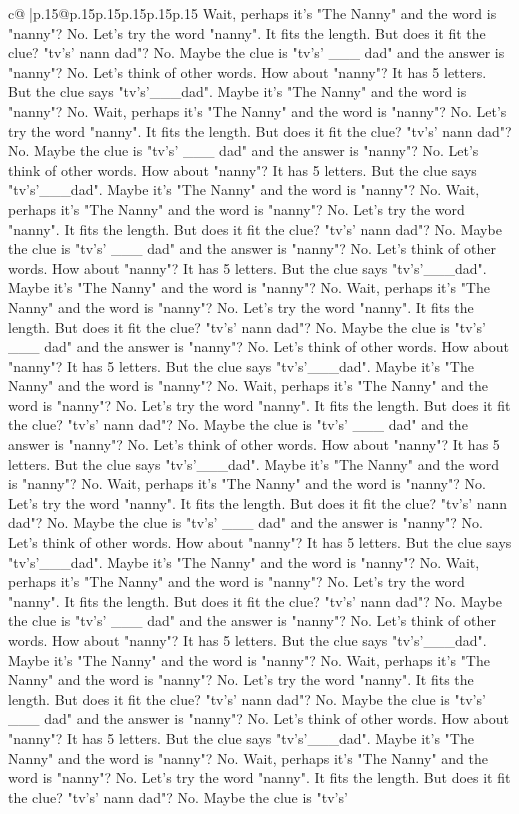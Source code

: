 \documentclass{article}
\begin{document}
{\begin{supertabular}{c@{$\;$}|p{.15\linewidth}@{}p{.15\linewidth}p{.15\linewidth}p{.15\linewidth}p{.15\linewidth}p{.15\linewidth}}
{{{Wait, perhaps it's "The Nanny" and the word is "nanny"? No. Let's try the word "nanny". It fits the length. But does it fit the clue? "tv's' nann dad"? No. Maybe the clue is "tv's' \_\_\_ dad" and the answer is "nanny"? No. Let's think of other words. How about "nanny"? It has 5 letters. But the clue says "tv's'\_\_\_dad". Maybe it's "The Nanny" and the word is "nanny"? No. Wait, perhaps it's "The Nanny" and the word is "nanny"? No. Let's try the word "nanny". It fits the length. But does it fit the clue? "tv's' nann dad"? No. Maybe the clue is "tv's' \_\_\_ dad" and the answer is "nanny"? No. Let's think of other words. How about "nanny"? It has 5 letters. But the clue says "tv's'\_\_\_dad". Maybe it's "The Nanny" and the word is "nanny"? No. Wait, perhaps it's "The Nanny" and the word is "nanny"? No. Let's try the word "nanny". It fits the length. But does it fit the clue? "tv's' nann dad"? No. Maybe the clue is "tv's' \_\_\_ dad" and the answer is "nanny"? No. Let's think of other words. How about "nanny"? It has 5 letters. But the clue says "tv's'\_\_\_dad". Maybe it's "The Nanny" and the word is "nanny"? No. Wait, perhaps it's "The Nanny" and the word is "nanny"? No. Let's try the word "nanny". It fits the length. But does it fit the clue? "tv's' nann dad"? No. Maybe the clue is "tv's' \_\_\_ dad" and the answer is "nanny"? No. Let's think of other words. How about "nanny"? It has 5 letters. But the clue says "tv's'\_\_\_dad". Maybe it's "The Nanny" and the word is "nanny"? No. Wait, perhaps it's "The Nanny" and the word is "nanny"? No. Let's try the word "nanny". It fits the length. But does it fit the clue? "tv's' nann dad"? No. Maybe the clue is "tv's' \_\_\_ dad" and the answer is "nanny"? No. Let's think of other words. How about "nanny"? It has 5 letters. But the clue says "tv's'\_\_\_dad". Maybe it's "The Nanny" and the word is "nanny"? No. Wait, perhaps it's "The Nanny" and the word is "nanny"? No. Let's try the word "nanny". It fits the length. But does it fit the clue? "tv's' nann dad"? No. Maybe the clue is "tv's' \_\_\_ dad" and the answer is "nanny"? No. Let's think of other words. How about "nanny"? It has 5 letters. But the clue says "tv's'\_\_\_dad". Maybe it's "The Nanny" and the word is "nanny"? No. Wait, perhaps it's "The Nanny" and the word is "nanny"? No. Let's try the word "nanny". It fits the length. But does it fit the clue? "tv's' nann dad"? No. Maybe the clue is "tv's' \_\_\_ dad" and the answer is "nanny"? No. Let's think of other words. How about "nanny"? It has 5 letters. But the clue says "tv's'\_\_\_dad". Maybe it's "The Nanny" and the word is "nanny"? No. Wait, perhaps it's "The Nanny" and the word is "nanny"? No. Let's try the word "nanny". It fits the length. But does it fit the clue? "tv's' nann dad"? No. Maybe the clue is "tv's' \_\_\_ dad" and the answer is "nanny"? No. Let's think of other words. How about "nanny"? It has 5 letters. But the clue says "tv's'\_\_\_dad". Maybe it's "The Nanny" and the word is "nanny"? No. Wait, perhaps it's "The Nanny" and the word is "nanny"? No. Let's try the word "nanny". It fits the length. But does it fit the clue? "tv's' nann dad"? No. Maybe the clue is "tv's' }}}
\end{supertabular}}
\end{document}
